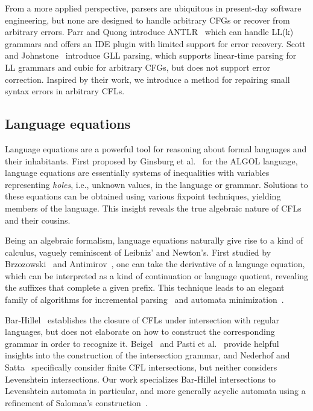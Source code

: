 \documentclass[sigplan,review,acmsmall,nonacm,screen,anonymous]{acmart}\settopmatter{printfolios=false,printccs=false,printacmref=false}
\begin{document}
From a more applied perspective, parsers are ubiquitous in present-day software engineering, but none are designed to handle arbitrary CFGs or recover from arbitrary errors. Parr and Quong introduce ANTLR~\cite{parr1995antlr} which can handle LL(k) grammars and offers an IDE plugin with limited support for error recovery. Scott and Johnstone~\cite{scott2010gll} introduce GLL parsing, which supports linear-time parsing for LL grammars and cubic for arbitrary CFGs, but does not support error correction. Inspired by their work, we introduce a method for repairing small syntax errors in arbitrary CFLs.

\subsection{Language equations}

Language equations are a powerful tool for reasoning about formal languages and their inhabitants. First proposed by Ginsburg et al.~\cite{ginsburg1962two} for the ALGOL language, language equations are essentially systems of inequalities with variables representing \textit{holes}, i.e., unknown values, in the language or grammar. Solutions to these equations can be obtained using various fixpoint techniques, yielding members of the language. This insight reveals the true algebraic nature of CFLs and their cousins.

Being an algebraic formalism, language equations naturally give rise to a kind of calculus, vaguely reminiscent of Leibniz' and Newton's. First studied by Brzozowski~\cite{brzozowski1964derivatives, brzozowski1980equations} and Antimirov~\cite{antimirov1996partial}, one can take the derivative of a language equation, which can be interpreted as a kind of continuation or language quotient, revealing the suffixes that complete a given prefix. This technique leads to an elegant family of algorithms for incremental parsing~\cite{might2011parsing, adams2016complexity} and automata minimization~\cite{brzozowski1962canonical}.

Bar-Hillel~\cite{bar1961formal} establishes the closure of CFLs under intersection with regular languages, but does not elaborate on how to construct the corresponding grammar in order to recognize it. Beigel~\cite{beigelproof} and Pasti et al.~\cite{pasti2023intersection} provide helpful insights into the construction of the intersection grammar, and Nederhof and Satta~\cite{nederhof2004language} specifically consider finite CFL intersections, but neither considers Levenshtein intersections. Our work specializes Bar-Hillel intersections to Levenshtein automata in particular, and more generally acyclic automata using a refinement of Salomaa's construction~\cite{salomaa1973formal}.
\end{document}
